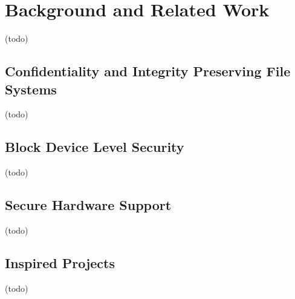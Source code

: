 \chapter{Background and Related Work} \label{chp:related}

(todo)

\section{Confidentiality and Integrity Preserving File Systems}

(todo)

\section{Block Device Level Security}

(todo)

\section{Secure Hardware Support}

(todo)

\section{Inspired Projects} \label{sec:inspired}

(todo)
